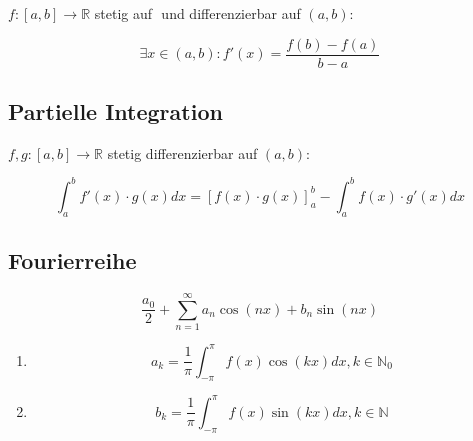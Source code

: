 \documentclass[]{article}
\begin{document}
			\begin{math} f: [a,b] \to \mathbb{R} \end{math} stetig auf \begin{math} [a,b] \end{math} und differenzierbar auf \begin{math} (a,b) \end{math}:
			
			\begin{displaymath}
				\exists x \in (a,b):f'(x) = \frac{f(b) - f(a)}{b - a}
			\end{displaymath}
	
		\subsection{Partielle Integration}
			\begin{math} f, g: [a, b] \to \mathbb{R} \end{math} stetig differenzierbar auf \begin{math} (a,b) \end{math}:
			
			\begin{displaymath}
				\int_{a}^{b} f'(x) \cdot g(x) dx = [f(x) \cdot g(x)]_{a}^{b} - \int_{a}^{b} f(x) \cdot g'(x) dx
			\end{displaymath}
		
		\subsection{Fourierreihe}
		
			\begin{displaymath}
				\frac{a_0}{2} + \sum_{n=1}^{\infty} a_n \cos(nx) + b_n \sin(nx)
			\end{displaymath}
			
			\begin{enumerate}[]
				
			\item \begin{displaymath}
				a_k = \frac{1}{\pi} \int_{-\pi}^{\pi} f(x) \cos(kx) dx, k \in \mathbb{N}_0
			\end{displaymath}
		
			\item \begin{displaymath}
				b_k = \frac{1}{\pi} \int_{-\pi}^{\pi} f(x) \sin(kx) dx, k \in \mathbb{N}
			\end{displaymath}
			
			\end{enumerate}
			
\end{document}
